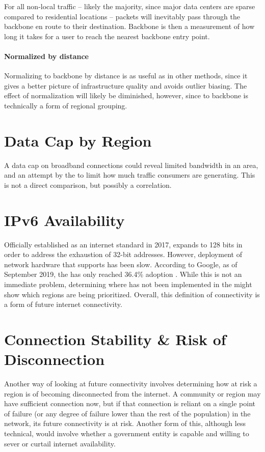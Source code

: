 For all non-local traffic -- likely the majority, since major data centers are sparse compared to residential locations -- packets will inevitably pass through the backbone en route to their destination. Backbone \rtt is then a measurement of how long it takes for a user to reach the nearest backbone entry point.

\paragraph{Normalized by distance}

Normalizing \rtt to backbone by distance is as useful as in other \rtt methods, since it gives a better picture of infrastructure quality and avoids outlier biasing. The effect of normalization will likely be diminished, however, since \rtt to backbone is technically a form of regional grouping.

\section{Data Cap by Region}

A data cap on broadband connections could reveal limited bandwidth in an area, and an attempt by the \isp to limit how much traffic consumers are generating. This is not a direct comparison, but possibly a correlation.

\section{IPv6 Availability}\label{sec:definition_ipv6}

Officially established as an internet standard in 2017, \ipvs expands \ipvf to 128 bits in order to address the exhaustion of 32-bit \ipvf addresses. However, deployment of network hardware that supports \ipvs has been slow. According to Google, as of September 2019, the \us has only reached 36.4\% \ipvs adoption \cite{Google2019a}. While this is not an immediate problem, determining where \ipvs has not been implemented in the \us might show which regions are being prioritized. Overall, this definition of connectivity is a form of future internet connectivity.

\section{Connection Stability \& Risk of Disconnection}
Another way of looking at future connectivity involves determining how at risk a region is of becoming disconnected from the internet. A community or region may have sufficient connection now, but if that connection is reliant on a single point of failure (or any degree of failure lower than the rest of the population) in the network, its future connectivity is at risk. Another form of this, although less technical, would involve whether a government entity is capable and willing to sever or curtail internet availability.